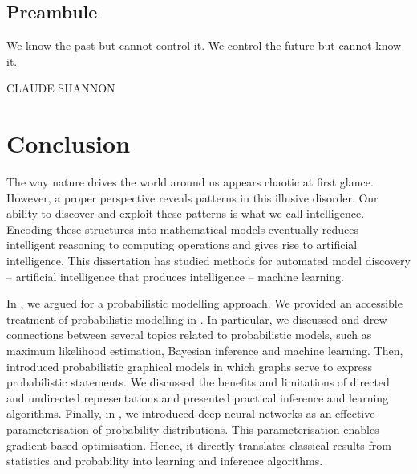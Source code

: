 \thispagestyle{empty}
\section*{Preambule}

\vfill

{\centering
\parbox{\textwidth}{%
  \raggedright
  {%

  We know the past but cannot control it. We control the future but cannot know it.\par\bigskip
  }
  \raggedleft\MakeUppercase{Claude Shannon}\par%
}}

\vfill\vfill


\chapter{Conclusion}\label{ch:08}
The way nature drives the world around us appears chaotic at first glance. However, a proper perspective reveals patterns in this illusive disorder. Our ability to discover and exploit these patterns is what we call intelligence. Encoding these structures into mathematical models eventually reduces intelligent reasoning to computing operations and gives rise to artificial intelligence. This dissertation has studied methods for automated model discovery -- artificial intelligence that produces intelligence -- machine learning.

In , we argued for a probabilistic modelling approach. We provided an accessible treatment of probabilistic modelling in . In particular, we discussed and drew connections between several topics related to probabilistic models, such as maximum likelihood estimation, Bayesian inference and machine learning. Then,  introduced probabilistic graphical models in which graphs serve to express probabilistic statements. We discussed the benefits and limitations of directed and undirected representations and presented practical inference and learning algorithms. Finally, in , we introduced deep neural networks as an effective parameterisation of probability distributions. This parameterisation enables gradient-based optimisation. Hence, it directly translates classical results from statistics and probability into learning and inference algorithms.

